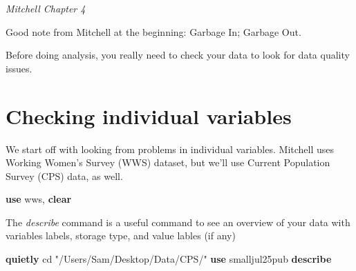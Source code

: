 \documentclass[
]{book}
\newenvironment{Shaded}{\begin{snugshade}}{\end{snugshade}}
\newcommand{\KeywordTok}[1]{\textcolor[rgb]{0.13,0.29,0.53}{\textbf{#1}}}
\newcommand{\NormalTok}[1]{#1}
\newcommand{\StringTok}[1]{\textcolor[rgb]{0.31,0.60,0.02}{#1}}
\begin{document}
\emph{Mitchell Chapter 4}

Good note from Mitchell at the beginning: Garbage In; Garbage Out.

Before doing analysis, you really need to check your data to look for data quality issues.

\section{Checking individual variables}\label{checking-individual-variables}

We start off with looking from problems in individual variables. Mitchell uses Working Women's Survey (WWS) dataset, but we'll use Current Population Survey (CPS) data, as well.

\begin{Shaded}
\begin{Highlighting}[]
\KeywordTok{use}\NormalTok{ wws, }\KeywordTok{clear}
\end{Highlighting}
\end{Shaded}

The \emph{describe} command is a useful command to see an overview of your data
with variables labels, storage type, and value lables (if any)

\begin{Shaded}
\begin{Highlighting}[]
\KeywordTok{quietly}\NormalTok{ cd }\StringTok{"/Users/Sam/Desktop/Data/CPS/"}
\KeywordTok{use}\NormalTok{ smalljul25pub}
\KeywordTok{describe}
\end{Highlighting}
\end{Shaded}
\end{document}
